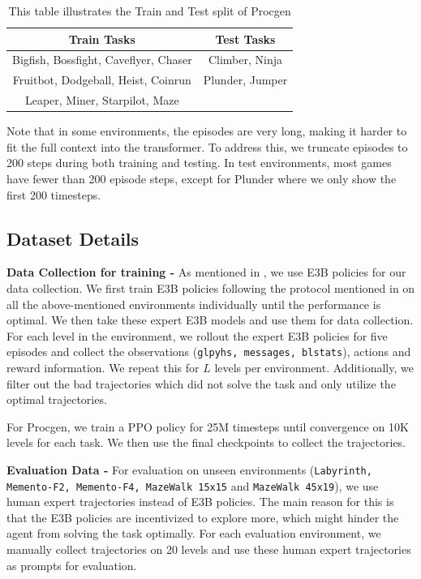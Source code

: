 \begin{table}[h!]
\centering
\begin{tabular}{c c }
\hline
\textbf{Train Tasks} & \textbf{Test Tasks} \\
\hline
Bigfish, Bossfight, Caveflyer, Chaser & Climber, Ninja \\
Fruitbot, Dodgeball, Heist, Coinrun & Plunder, Jumper \\ 
Leaper, Miner, Starpilot, Maze \\
\hline
\end{tabular}

\caption{ This table illustrates the Train and Test split of Procgen }

\label{tab:env_details_procgen}
\end{table}

Note that in some environments, the episodes are very long, making it harder to fit the full context into the transformer. To address this, we truncate episodes to 200 steps during both training and testing. In test environments, most games have fewer than 200 episode steps, except for Plunder where we only show the first 200 timesteps.
\subsection{Dataset Details}
\label{app:expert_data}
\textbf{Data Collection  for training - }
As mentioned in , we use E3B policies \citep{E3B} for our data collection. We first train E3B policies following the protocol mentioned in \cite{E3B} on all the above-mentioned environments individually until the performance is optimal. We then take these expert E3B models and use them for data collection. For each level in the environment, we rollout the expert E3B policies for five episodes and collect the observations (\texttt{glpyhs, messages, blstats}), actions and reward information. We repeat this for $L$ levels per environment. Additionally, we filter out the bad trajectories which did not solve the task and only utilize the optimal trajectories. 

For Procgen, we train a PPO policy for 25M timesteps until convergence on 10K levels for each task. We then use the final checkpoints to collect the trajectories.

\textbf{Evaluation Data -} For evaluation on unseen environments (\texttt{Labyrinth, Memento-F2, Memento-F4, MazeWalk 15x15} and \texttt{MazeWalk 45x19}), we use human expert trajectories instead of E3B policies. The main reason for this is that the E3B policies are incentivized to explore more, which might hinder the agent from solving the task optimally. For each evaluation environment, we manually collect trajectories on 20 levels and use these human expert trajectories as prompts for evaluation.

